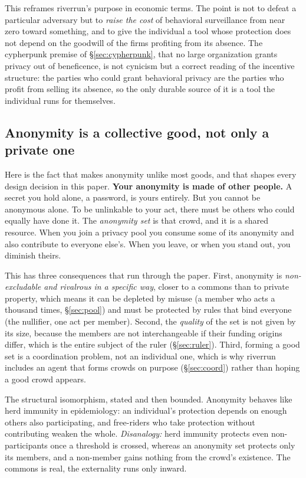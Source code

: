 \documentclass[11pt]{article}
\begin{document}
This reframes riverrun's purpose in economic terms. The point is not to defeat a
particular adversary but to \emph{raise the cost} of behavioral surveillance from near
zero toward something, and to give the individual a tool whose protection does not depend
on the goodwill of the firms profiting from its absence. The cypherpunk premise of
\S\ref{sec:cypherpunk}, that no large organization grants privacy out of beneficence, is
not cynicism but a correct reading of the incentive structure: the parties who could grant
behavioral privacy are the parties who profit from selling its absence, so the only
durable source of it is a tool the individual runs for themselves.

\subsection{Anonymity is a collective good, not only a private one}

Here is the fact that makes anonymity unlike most goods, and that shapes every design
decision in this paper. \textbf{Your anonymity is made of other people.} A secret you
hold alone, a password, is yours entirely. But you cannot be anonymous alone. To be
unlinkable to your act, there must be others who could equally have done it. The
\emph{anonymity set} is that crowd, and it is a shared resource. When you join a privacy
pool you consume some of its anonymity and also contribute to everyone else's. When you
leave, or when you stand out, you diminish theirs.

This has three consequences that run through the paper. First, anonymity is
\emph{non-excludable and rivalrous in a specific way}, closer to a commons than to
private property, which means it can be depleted by misuse (a member who acts a thousand
times, \S\ref{sec:pool}) and must be protected by rules that bind everyone (the
nullifier, one act per member). Second, the \emph{quality} of the set is not given by
its size, because the members are not interchangeable if their funding origins differ,
which is the entire subject of the ruler (\S\ref{sec:ruler}). Third, forming a good set
is a coordination problem, not an individual one, which is why riverrun includes an
agent that forms crowds on purpose (\S\ref{sec:coord}) rather than hoping a good crowd
appears.

\begin{intuition}
The structural isomorphism, stated and then bounded. Anonymity behaves like herd
immunity in epidemiology: an individual's protection depends on enough others also
participating, and free-riders who take protection without contributing weaken the whole.
\emph{Disanalogy:} herd immunity protects even non-participants once a threshold is
crossed, whereas an anonymity set protects only its members, and a non-member gains
nothing from the crowd's existence. The commons is real, the externality runs only
inward.
\end{intuition}
\end{document}
